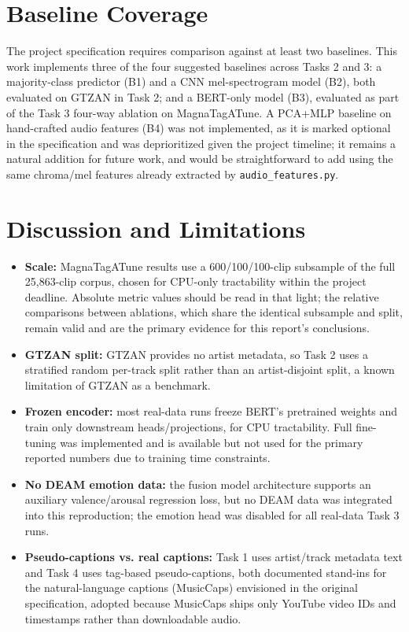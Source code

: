 \documentclass[conference]{IEEEtran}
\begin{document}
\section{Baseline Coverage}
The project specification requires comparison against at least two baselines. This work implements three of the four suggested baselines across Tasks 2 and 3: a majority-class predictor (B1) and a CNN mel-spectrogram model (B2), both evaluated on GTZAN in Task 2; and a BERT-only model (B3), evaluated as part of the Task 3 four-way ablation on MagnaTagATune. A PCA+MLP baseline on hand-crafted audio features (B4) was not implemented, as it is marked optional in the specification and was deprioritized given the project timeline; it remains a natural addition for future work, and would be straightforward to add using the same chroma/mel features already extracted by \texttt{audio\_features.py}.

\section{Discussion and Limitations}
\label{sec:discussion}
\begin{itemize}
\item \textbf{Scale:} MagnaTagATune results use a 600/100/100-clip subsample of the full 25{,}863-clip corpus, chosen for CPU-only tractability within the project deadline. Absolute metric values should be read in that light; the relative comparisons between ablations, which share the identical subsample and split, remain valid and are the primary evidence for this report's conclusions.
\item \textbf{GTZAN split:} GTZAN provides no artist metadata, so Task 2 uses a stratified random per-track split rather than an artist-disjoint split, a known limitation of GTZAN as a benchmark.
\item \textbf{Frozen encoder:} most real-data runs freeze BERT's pretrained weights and train only downstream heads/projections, for CPU tractability. Full fine-tuning was implemented and is available but not used for the primary reported numbers due to training time constraints.
\item \textbf{No DEAM emotion data:} the fusion model architecture supports an auxiliary valence/arousal regression loss, but no DEAM data was integrated into this reproduction; the emotion head was disabled for all real-data Task 3 runs.
\item \textbf{Pseudo-captions vs. real captions:} Task 1 uses artist/track metadata text and Task 4 uses tag-based pseudo-captions, both documented stand-ins for the natural-language captions (MusicCaps) envisioned in the original specification, adopted because MusicCaps ships only YouTube video IDs and timestamps rather than downloadable audio.
\end{itemize}
\end{document}
